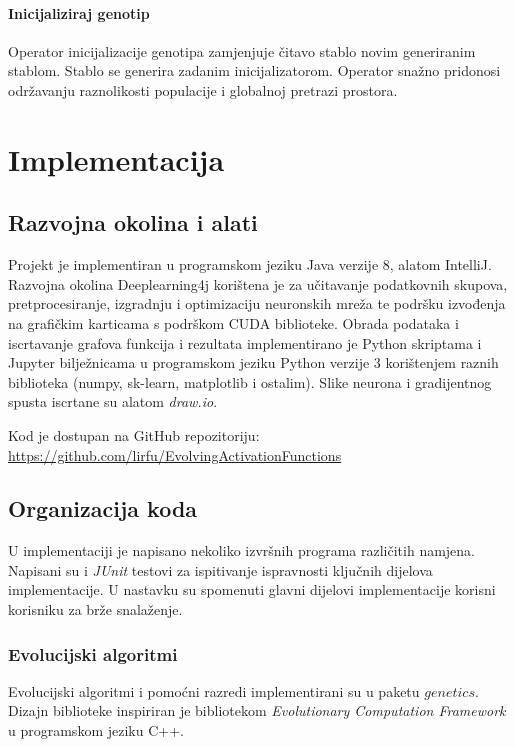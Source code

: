 \documentclass[times, utf8, numeric, diplomski]{fer}
\begin{document}
\subsubsection{Inicijaliziraj genotip}
Operator inicijalizacije genotipa zamjenjuje čitavo stablo novim generiranim stablom. Stablo se generira zadanim inicijalizatorom. Operator snažno pridonosi održavanju raznolikosti populacije i globalnoj pretrazi prostora.


\chapter{Implementacija}
\section{Razvojna okolina i alati}
Projekt je implementiran u programskom jeziku Java verzije 8, alatom IntelliJ. Razvojna okolina Deeplearning4j \citep{dl4j} korištena je za učitavanje podatkovnih skupova, pretprocesiranje, izgradnju i optimizaciju neuronskih mreža te podršku izvođenja na grafičkim karticama s podrškom CUDA biblioteke. Obrada podataka i iscrtavanje grafova funkcija i rezultata implementirano je Python skriptama i Jupyter bilježnicama u programskom jeziku Python verzije 3 korištenjem raznih biblioteka (numpy, sk-learn, matplotlib i ostalim). Slike neurona i gradijentnog spusta iscrtane su alatom \textit{draw.io}.

\noindent
Kod je dostupan na GitHub repozitoriju: \\
\url{https://github.com/lirfu/EvolvingActivationFunctions}

\section{Organizacija koda}
U implementaciji je napisano nekoliko izvršnih programa različitih namjena. Napisani su i \textit{JUnit} testovi za ispitivanje ispravnosti ključnih dijelova implementacije. U nastavku su spomenuti glavni dijelovi implementacije korisni korisniku za brže snalaženje.

\subsection{Evolucijski algoritmi}
Evolucijski algoritmi i pomoćni razredi implementirani su u paketu $genetics$. Dizajn biblioteke inspiriran je bibliotekom \textit{Evolutionary Computation Framework} \citep{ecf} u programskom jeziku C++. 
\end{document}
